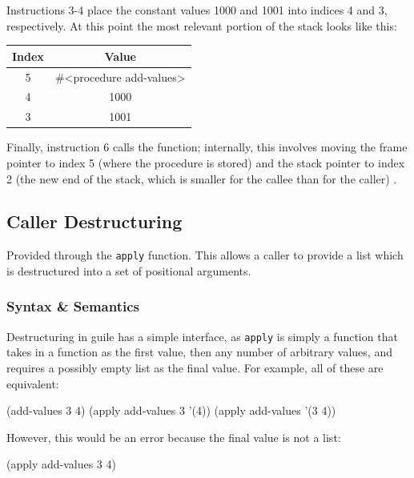 Instructions 3-4 place the constant values 1000 and 1001 into indices 4 and 3, respectively.
At this point the most relevant portion of the stack looks like this:

\begin{center}
	\begin{tabular}{ | c | c | }
		\hline
		Index & Value \\
		\hline
		5     & \#\textless procedure add-values\textgreater \\
		4     & 1000 \\
		3     & 1001 \\
		\hline
	\end{tabular}
\end{center}

Finally, instruction 6 calls the function; internally, this involves moving the frame
pointer to index 5 (where the procedure is stored) and the stack pointer to index 2 (the
new end of the stack, which is smaller for the callee than for the caller)
\parencite[][libguile/vm-engine.c lines 451-454]{guile-source}.

\subsection{Caller Destructuring}
Provided through the \texttt{apply} function. This allows a caller to provide
a list which is destructured into a set of positional arguments.

\subsubsection{Syntax \& Semantics}
Destructuring in guile has a simple interface, as \texttt{apply} is simply a function that
takes in a function as the first value, then any number of arbitrary values, and requires
a possibly empty list as the final value.
For example, all of these are equivalent:

\begin{pygmented}[lang=lisp]
(add-values 3 4)
(apply add-values 3 '(4))
(apply add-values '(3 4))
\end{pygmented}

However, this would be an error because the final value is not a list:

\begin{pygmented}[lang=lisp]
(apply add-values 3 4)
\end{pygmented}

